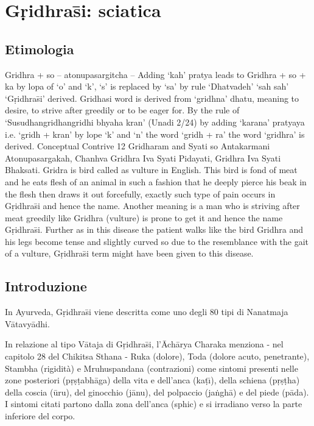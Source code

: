 

\chapter{G\d{r}idhra\={s}i: sciatica}                  %

\section{Etimologia}


Gridhra + so – atonupasargitcha – Adding ‘kah’ pratya leads to
Gridhra + so + ka by lopa of ‘o’ and ‘k’, ‘s’ is replaced by ‘sa’ by rule
‘Dhatvadeh’ ‘sah sah’ ‘G\d{r}idhra\={s}i’ derived.
Gridhasi word is derived from ‘gridhna’ dhatu, meaning to
desire, to strive after greedily or to be eager for. By the rule of
‘Susudhangridhangridhi bhyaha kran’ (Unadi 2/24) by adding
‘karana’ pratyaya i.e. ‘gridh + kran’ by lope ‘k’ and ‘n’ the word ‘gridh +
ra’ the word ‘gridhra’ is derived.
Conceptual Contrive
12
Gridharam and Syati so Antakarmani Atonupasargakah,
Chanhva Gridhra Iva Syati Pidayati, Gridhra Iva Syati Bhaksati.
Gridra is bird called as vulture in English. This bird is fond of
meat and he eats flesh of an animal in such a fashion that he deeply
pierce his beak in the flesh then draws it out forcefully, exactly such
type of pain occurs in G\d{r}idhra\={s}i and hence the name.
Another meaning is a man who is striving after meat greedily
like Gridhra (vulture) is prone to get it and hence the name G\d{r}idhra\={s}i.
Further as in this disease the patient walks like the bird
Gridhra and his legs become tense and slightly curved so due to the
resemblance with the gait of a vulture, G\d{r}idhra\={s}i term might have
been given to this disease.


\section{Introduzione}

In Ayurveda, G\d{r}idhra\={s}i viene descritta come uno degli 80 tipi di Nanatmaja V\={a}tavy\={a}dhi.

In relazione al tipo V\={a}taja di G\d{r}idhra\={s}i, l'\={A}ch\={a}rya Charaka menziona - nel capitolo 28 del Chikitsa Sthana - Ruka (dolore), Toda (dolore acuto, penetrante), Stambha (rigidità) e Mruhuspandana (contrazioni) come sintomi presenti nelle zone posteriori (p\d{r}\d{s}\d{t}abh\={a}ga) della vita e dell'anca (ka\d{t}\={\i}), della schiena (p\d{r}\d{s}\d{t}ha) della coscia (\={u}ru), del ginocchio (j\={a}nu), del polpaccio (ja\.{n}gh\={a}) e del piede (p\={a}da). I sintomi citati partono dalla zona dell'anca (sphic) e si irradiano verso la parte inferiore del corpo.

